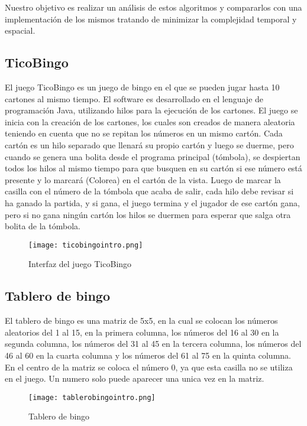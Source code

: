 \documentclass[10pt,twocolumn]{article}
\begin{document}
 Nuestro objetivo es realizar un análisis de estos algoritmos y compararlos con una implementación de los mismos tratando de minimizar la complejidad temporal y espacial.

\subsection{TicoBingo}

El juego TicoBingo es un juego de bingo en el que se pueden jugar hasta 10 cartones al mismo tiempo. 
El software es desarrollado en el lenguaje de programación Java, utilizando hilos para la ejecución de los cartones.
El juego se inicia con la creación de los cartones, los cuales son creados de manera aleatoria teniendo en cuenta que no se repitan los números en un mismo cartón.
Cada cartón es un hilo separado que llenará su propio cartón y luego se duerme, pero cuando se genera una bolita desde el programa principal (tómbola), se despiertan todos los hilos al mismo tiempo para que busquen en su cartón si ese número está presente y lo marcará (Colorea) en el cartón de la vista. Luego de marcar la casilla con el número de la tómbola que acaba de salir, cada hilo debe revisar si ha ganado la partida, y si gana, el juego termina y el jugador de ese cartón gana, pero si no gana ningún cartón los hilos se duermen para esperar que salga otra bolita de la tómbola.


  \begin{figure}[h]
 	\centering
 	\texttt{[image: ticobingointro.png]}
 	\caption{Interfaz del juego TicoBingo}
 	\label{arreglo_pv}
 \end{figure}

\subsection{Tablero de bingo}

El tablero de bingo es una matriz de 5x5, en la cual se colocan los números aleatorios del 1 al 15, en la primera columna, los números del 16 al 30 en la segunda columna, los números del 31 al 45 en la tercera columna, los números del 46 al 60 en la cuarta columna y los números del 61 al 75 en la quinta columna. En el centro de la matriz se coloca el número 0, ya que esta casilla no se utiliza en el juego. Un numero solo puede aparecer una unica vez en la matriz.

\begin{figure}[h]
	\centering
	\texttt{[image: tablerobingointro.png]}
	\caption{Tablero de bingo}
	\label{arreglo_pv}
\end{figure}
\end{document}
